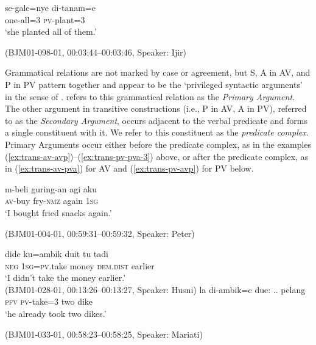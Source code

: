 \documentclass[output=paper,
\ChapterDOI{10.5281/zenodo.15697583}
colorlinks,
citecolor=brown]{langscibook}
\begin{document}
\begin{exe}
    \ex\label{ex:trans-pv-pva-3} 
    \begin{xlist}
        \exi{}
        \gll se-gale=nye di-tanam=e\\
        one-all=3 \textsc{pv}-plant=3\\
        \trans `she planted all of them.'
    \end{xlist}
    \hfill (BJM01-098-01, 00:03:44–00:03:46, Speaker: Ijir)
\end{exe}

Grammatical relations are not marked by case or agreement, but S, A in AV, and P in PV pattern together and appear to be the `privileged syntactic arguments' in the sense of \citet{vanvalin1997syntax}. \citet{mcdonnell2022universal} refers to this grammatical relation as the \emph{Primary Argument}. The other argument in transitive constructions (i.e., P in AV, A in PV), referred to as the \emph{Secondary Argument}, occurs adjacent to the verbal predicate and forms a single constituent with it. We refer to this constituent as the \emph{predicate complex}. Primary Arguments occur either before the predicate complex, as in the examples (\ref{ex:trans-av-avp})--(\ref{ex:trans-pv-pva-3}) above, or after the predicate complex, as in (\ref{ex:trans-av-pva}) for AV and (\ref{ex:trans-pv-avp}) for PV below.


\begin{exe}
    \ex\label{ex:trans-av-pva} 
    \begin{xlist}
        \exi{}
        \gll m-beli guring-an agi aku\\
        \textsc{av}-buy fry-\textsc{nmz} again 1\textsc{sg}\\
        \trans `I bought fried snacks again.'
    \end{xlist}
    \hfill (BJM01-004-01, 00:59:31–00:59:32, Speaker: Peter)
\end{exe}


\begin{exe}
    \ex\label{ex:trans-pv-avp} 
    \begin{xlist}
        \ex
        \gll dide ku=ambik duit tu tadi\\
        \textsc{neg} 1\textsc{sg}=\textsc{pv}.take money \textsc{dem.dist} earlier\\
        \trans `I didn't take the money earlier.' \\
        \hfill (BJM01-028-01, 00:13:26–00:13:27, Speaker: Husni)
        \ex
        \gll la di-ambik=e due: {..} pelang\\
        \textsc{pfv} \textsc{pv}-take=\textsc{3} two {} dike\\
        \trans `he already took two dikes.'
    \end{xlist}
    \hfill (BJM01-033-01, 00:58:23–00:58:25, Speaker: Mariati)
\end{exe}
\end{document}
